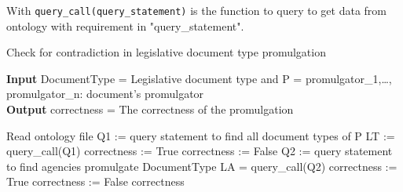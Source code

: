 With \texttt{query\_call(query\_statement)} is the function to query to get data from ontology with requirement in "query\_statement".

\begin{algorithm}[H]
\caption{Check for contradiction in legislative document type promulgation}\label{alg:contradict}
\hspace*{\algorithmicindent} \textbf{Input} DocumentType = Legislative document type and P = { promulgator\_1,…, promulgator\_n}: document's promulgator\\
\hspace*{\algorithmicindent} \textbf{Output} correctness = The correctness of the promulgation
\begin{algorithmic}[1]
\State Read ontology file
 
\State Q1 := query statement to find all document types of P
\State LT := query\_call(Q1) 
\State correctness := True
\Else 
\State correctness := False
\EndIf
\Else {}
\State Q2 := query statement to find agencies promulgate DocumentType
\State LA = query\_call(Q2) 
\State correctness := True
\Else
\State correctness := False
\EndIf
\EndIf
\EndIf
\State \Return correctness
\end{algorithmic}
\end{algorithm}